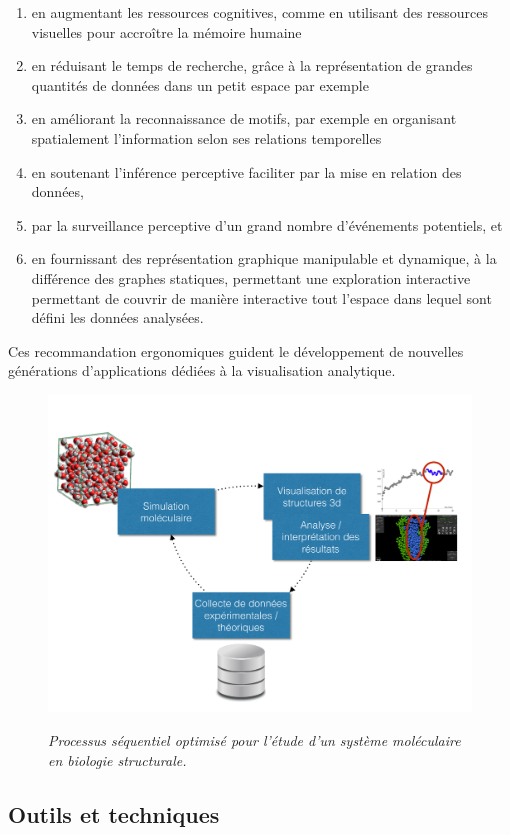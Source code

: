 \begin{enumerate}
  \item en augmentant les ressources cognitives, comme en utilisant des ressources visuelles pour accroître la mémoire humaine
  \item en réduisant le temps de recherche, grâce à la représentation de grandes quantités de données dans un petit espace par exemple
  \item en améliorant la reconnaissance de motifs, par exemple en organisant spatialement l'information selon ses relations temporelles
  \item en soutenant l'inférence perceptive faciliter par la mise en relation des données, 
  \item par la surveillance perceptive d'un grand nombre d'événements potentiels, et
  \item en fournissant des représentation graphique manipulable et dynamique, à la différence des graphes statiques, permettant une exploration interactive permettant de couvrir de manière interactive tout l'espace dans lequel sont défini les données analysées.
\end{enumerate}

Ces recommandation ergonomiques guident le développement de nouvelles générations d'applications dédiées à la visualisation analytique.

\begin{figure}
  \centering
  {\includegraphics[width=.75\linewidth]{./figures/ch2/ch2_structural_biology_optim.pdf}}
    \caption{{\it Processus séquentiel optimisé pour l'étude d'un système moléculaire en biologie structurale.}}
  \label{Fig:schema_seq_bio_optim}
  \hspace{0.3cm}
\end{figure}


\subsection{Outils et techniques} \label{visu_ana_tools}

